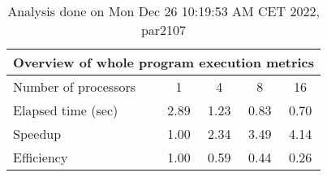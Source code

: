 \begin{table}[h]
\begin{center}
\begin{tabular}{|l|c|c|c|c|}
\hline
\multicolumn{5}{|c|}{Overview of whole program execution metrics} \\
\hline
\hline
Number of processors & 1 & 4 & 8 & 16 \\
\hline
Elapsed time (sec)      &       2.89 &       1.23 &       0.83 &       0.70 \\
\hline
Speedup                 &       1.00 &       2.34 &       3.49 &       4.14 \\
\hline
Efficiency              &       1.00 &       0.59 &       0.44 &       0.26 \\
\hline
\end{tabular}
\end{center}
\caption{ Analysis done on Mon Dec 26 10:19:53 AM CET 2022, par2107}
\end{table}
